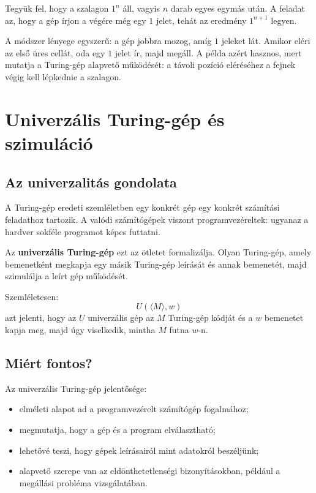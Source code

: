 Tegyük fel, hogy a szalagon $1^n$ áll, vagyis $n$ darab egyes egymás után. A feladat az, hogy a gép írjon a végére még egy $1$ jelet, tehát az eredmény $1^{n+1}$ legyen.


A módszer lényege egyszerű: a gép jobbra mozog, amíg $1$ jeleket lát. Amikor eléri az első üres cellát, oda egy $1$ jelet ír, majd megáll. A példa azért hasznos, mert mutatja a Turing-gép alapvető működését: a távoli pozíció eléréséhez a fejnek végig kell lépkednie a szalagon.

\section{Univerzális Turing-gép és szimuláció}

\subsection{Az univerzalitás gondolata}

A Turing-gép eredeti szemléletben egy konkrét gép egy konkrét számítási feladathoz tartozik. A valódi számítógépek viszont programvezéreltek: ugyanaz a hardver sokféle programot képes futtatni.

Az \textbf{univerzális Turing-gép} ezt az ötletet formalizálja. Olyan Turing-gép, amely bemenetként megkapja egy másik Turing-gép leírását és annak bemenetét, majd szimulálja a leírt gép működését.

Szemléletesen:
\[
  U(\langle M\rangle,w)
\]
azt jelenti, hogy az $U$ univerzális gép az $M$ Turing-gép kódját és a $w$ bemenetet kapja meg, majd úgy viselkedik, mintha $M$ futna $w$-n.

\subsection{Miért fontos?}

Az univerzális Turing-gép jelentősége:

\begin{itemize}
  \item elméleti alapot ad a programvezérelt számítógép fogalmához;
  \item megmutatja, hogy a gép és a program elválasztható;
  \item lehetővé teszi, hogy gépek leírásairól mint adatokról beszéljünk;
  \item alapvető szerepe van az eldönthetetlenségi bizonyításokban, például a megállási probléma vizsgálatában.
\end{itemize}

